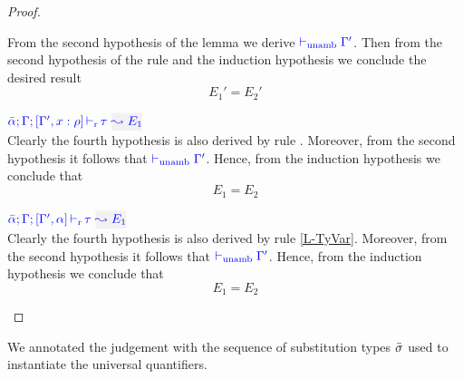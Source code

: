 \begin{proof}
\begin{description}
  From the second hypothesis of the lemma we derive ${\color{blue}  \vdash_{\mathrm{unamb}} \Gamma'}$.
  Then from the second hypothesis of the rule and the induction hypothesis we conclude
  the desired result
\begin{equation*}
  E_1' = E_2'
\end{equation*}

\item[\fbox{\rref{L-Var}}]\quad$\dlres{\bar{\alpha}}{\tenv}{\tenv',x:\rulet}{\type}{E_1}$\\

  Clearly the fourth hypothesis is also derived by rule .
  Moreover, from the second hypothesis it follows that ${\color{blue}  \vdash_{\mathrm{unamb}} \Gamma'}$.
  Hence, from the induction hypothesis we conclude that
\begin{equation*}
  E_1 = E_2
\end{equation*}

\item[\fbox{\rref{(L-TyVar)}}]\quad$\dlres{\bar{\alpha}}{\tenv}{\tenv',\alpha}{\type}{E_1}$\\
  Clearly the fourth hypothesis is also derived by rule \ref{L-TyVar}.
  Moreover, from the second hypothesis it follows that ${\color{blue}  \vdash_{\mathrm{unamb}} \Gamma'}$.
  Hence, from the induction hypothesis we conclude that
\begin{equation*}
  E_1 = E_2
\end{equation*}
\end{description}
\end{proof}

We annotated the judgement with the sequence of substitution types $\bar{\sigma}$
used to instantiate the universal quantifiers.

